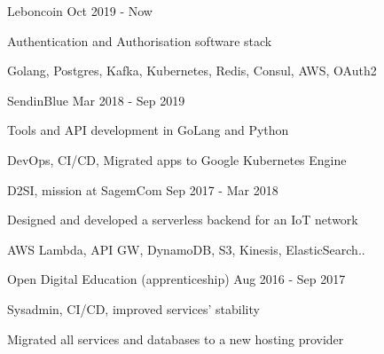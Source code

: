 


\begin{cventries}

\cventry
{} %
{Leboncoin} %
{Oct 2019 - Now} %
{} %
{ %
\begin{cvitems}
\item {Authentication and Authorisation software stack}
\item {Golang, Postgres, Kafka, Kubernetes, Redis, Consul, AWS, OAuth2}
\end{cvitems}
}


\cventry
{} %
{SendinBlue} %
{Mar 2018 - Sep 2019} %
{} %
{ %
\begin{cvitems}
\item {Tools and API development in GoLang and Python}
\item {DevOps, CI/CD, Migrated apps to Google Kubernetes Engine}
\end{cvitems}
}

\cventry
{} %
{D2SI, mission at SagemCom} %
{Sep 2017 - Mar 2018} %
{} %
{ %
\begin{cvitems}
\item {Designed and developed a serverless backend for an IoT network}
\item {AWS Lambda, API GW, DynamoDB, S3, Kinesis, ElasticSearch..}
\end{cvitems}
}

\cventry
{} %
{Open Digital Education (apprenticeship)} %
{Aug 2016 - Sep 2017} %
{} %
{ %
\begin{cvitems}
\item {Sysadmin, CI/CD, improved services' stability}
\item {Migrated all services and databases to a new hosting provider}
\end{cvitems}
}


\end{cventries}
